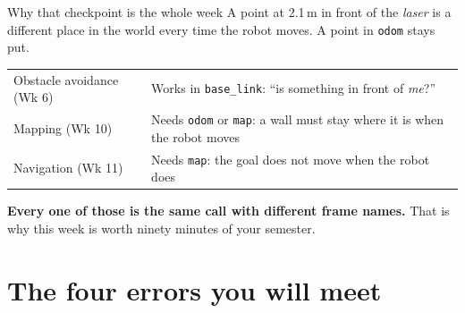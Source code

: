 \documentclass[aspectratio=169]{beamer}
\begin{document}
\begin{frame}{Why that checkpoint is the whole week}
  \small
  A point at 2.1\,m in front of the \emph{laser} is a different place in the world every time
  the robot moves. A point in \texttt{odom} stays put.

  \vspace{0.7em}
  \begin{center}
  \begin{tabular}{@{}p{3.3cm}p{7.4cm}@{}}
    \toprule
    Obstacle avoidance (Wk 6) & Works in \texttt{base\_link}: ``is something in front of \emph{me}?'' \\[0.3em]
    Mapping (Wk 10) & Needs \texttt{odom} or \texttt{map}: a wall must stay where it is when the robot moves \\[0.3em]
    Navigation (Wk 11) & Needs \texttt{map}: the goal does not move when the robot does \\
    \bottomrule
  \end{tabular}
  \end{center}

  \vspace{0.6em}
  \centering
  \textbf{Every one of those is the same call with different frame names.} That is why this
  week is worth ninety minutes of your semester.
\end{frame}

\section{The four errors you will meet}
\end{document}
